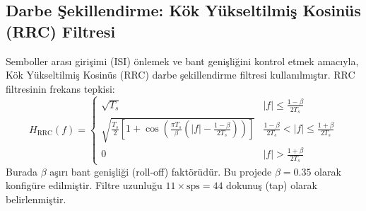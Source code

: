 \subsection{Darbe Şekillendirme: Kök Yükseltilmiş Kosinüs (RRC) Filtresi}
Semboller arası girişimi (ISI) önlemek ve bant genişliğini kontrol etmek amacıyla, Kök Yükseltilmiş Kosinüs (RRC) darbe şekillendirme filtresi kullanılmıştır. RRC filtresinin frekans tepkisi:
\begin{equation}
H_{\text{RRC}}(f) = \begin{cases} \sqrt{T_s} & |f| \leq \frac{1-\beta}{2T_s} \\ \sqrt{\frac{T_s}{2}\left[1 + \cos\left(\frac{\pi T_s}{\beta}\left(|f| - \frac{1-\beta}{2T_s}\right)\right)\right]} & \frac{1-\beta}{2T_s} < |f| \leq \frac{1+\beta}{2T_s} \\ 0 & |f| > \frac{1+\beta}{2T_s} \end{cases}
\end{equation}
Burada $\beta$ aşırı bant genişliği (roll-off) faktörüdür. Bu projede $\beta = 0.35$ olarak konfigüre edilmiştir. Filtre uzunluğu $11 \times \text{sps} = 44$ dokunuş (tap) olarak belirlenmiştir.
